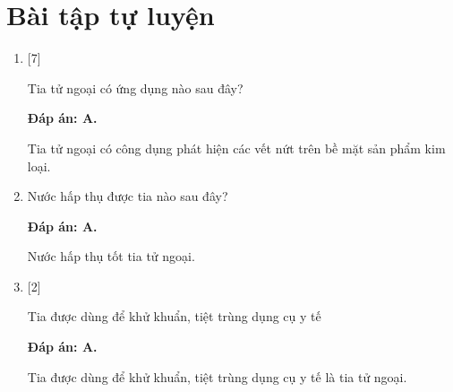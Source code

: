 \section{Bài tập tự luyện}
\begin{enumerate}[label=\bfseries Câu \arabic*:]
	
	\item {} [7]
	\cauhoi
	{Tia tử ngoại có ứng dụng nào sau đây?
	}
	
	\loigiai
	{		\textbf{Đáp án: A.}
		
		Tia tử ngoại có công dụng phát hiện các vết nứt trên bề mặt sản phẩm kim loại. 
	}
	
	\item {}
	{Nước hấp thụ được tia nào sau đây?
	}
	
	\loigiai
	{		\textbf{Đáp án: A.}
		
		Nước hấp thụ tốt tia tử ngoại.
	}
	
	\item {} [2]
	\cauhoi
	{Tia được dùng để khử khuẩn, tiệt trùng dụng cụ y tế
	}
	
	\loigiai
	{		\textbf{Đáp án: A.}
		
		Tia được dùng để khử khuẩn, tiệt trùng dụng cụ y tế là tia tử ngoại.
	}
	

\end{enumerate}
